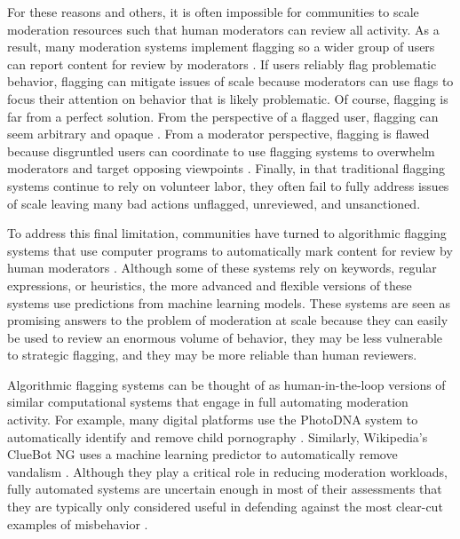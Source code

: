 \documentclass[format=acmsmall, natbib=true,  screen=true]{acmart}
\begin{document}
For these reasons and others, it is often impossible for communities to scale moderation resources such that human moderators can review all activity.
As a result, many moderation systems implement flagging so a wider group of users can report content for review by moderators \cite{grimmelmann_virtues_2015}.
If users reliably flag problematic behavior, flagging can mitigate issues of scale because moderators can use flags to focus their attention on behavior that is likely problematic.
Of course, flagging is far from a perfect solution. 
From the perspective of a flagged user, flagging can seem arbitrary and opaque \cite{crawford_what_2016}.  
From a moderator perspective, flagging is flawed because disgruntled users can coordinate to use flagging systems to overwhelm moderators and target opposing viewpoints \cite{crawford_what_2016}. 
Finally, in that traditional flagging systems continue to rely on volunteer labor, they often fail to fully address issues of scale leaving many bad actions unflagged, unreviewed, and unsanctioned. 

To address this final limitation, communities have turned to algorithmic flagging systems that use computer programs to automatically mark content for review by human moderators \citep{kiene_technological_2019, kiene_who_2020,seering_shaping_2017}. Although some of these systems rely on keywords, regular expressions, or heuristics, the more advanced and flexible versions of these systems use predictions from machine learning models. These systems are seen as promising answers to the problem of moderation at scale because they can easily be used to review an enormous volume of behavior, they may be less vulnerable to strategic flagging, and they may be more reliable than human reviewers.

Algorithmic flagging systems can be thought of as human-in-the-loop versions of similar computational systems that engage in full automating moderation activity. For example, many digital platforms use the PhotoDNA system to automatically identify and remove child pornography \cite{gillespie_custodians_2018}. Similarly, Wikipedia's ClueBot NG uses a machine learning predictor to automatically remove vandalism \cite{geiger_when_2013}. Although they play a critical role in reducing moderation workloads, fully automated systems are uncertain enough in most of their assessments that they are typically only considered useful in defending against the most clear-cut examples of misbehavior \cite{gillespie_custodians_2018}.
\end{document}
